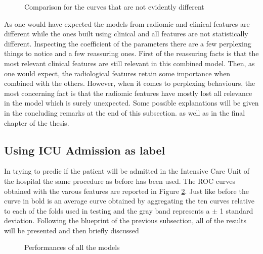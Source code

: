 \begin{figure}[H]
\centering
        \caption{Comparison for the curves that are not evidently different}\label{fig:delongDeath}
\end{figure}

As one would have expected the models from radiomic and clinical features are different while the ones built using clinical and all features are not statistically different. Inspecting the coefficient of the parameters there are a few perplexing things to notice and a few reassuring ones. First of the reassuring facts is that the most relevant clinical features are still relevant in this combined model. Then, as one would expect, the radiological features retain some importance when combined with the others. However, when it comes to perplexing behaviours, the most concerning fact is that the radiomic features have mostly lost all relevance in the model which is surely unexpected. Some possible explanations will be given in the concluding remarks at the end of this  subsection. as well as in the final chapter of the thesis.

\subsection{Using ICU Admission as label}

In trying to predic if the patient will be admitted in the Intensive Care Unit of the hospital the same procedure as before has been used. The ROC curves obtained with the varous features are reported in Figure \ref{fig:ICULasso}. Just like before the curve in bold is an average curve obtained by aggregating the ten curves relative to each of the folds used in testing and the gray band represents a $\pm$ 1 standard deviation. Following the blueprint of the previous subsection, all of the results will be presented and then  briefly discussed


\begin{figure}[H]
\centering
	\newline
        \caption{Performances of all the models}\label{fig:ICULasso}
\end{figure}

